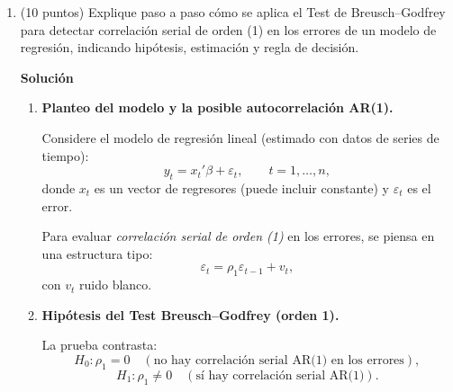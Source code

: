\documentclass[10pt,a4paper]{article}
\begin{document}
\begin{enumerate}
\textbf{(b) Efecto de incluir una variable instrumental.}
Si existe endogeneidad (\(\mathrm{Cov}(X,u)\neq0\)), el estimador MCO es sesgado e inconsistente. Al usar VI/MC2E se identifica el efecto causal utilizando solo la parte \emph{exógena} de \(X\) inducida por \(Z\), obteniendo un estimador \(\hat\beta_{IV}\) consistente. 
En modelos simples, \(\hat\beta_{IV} = \dfrac{\mathrm{Cov}(Y,Z)}{\mathrm{Cov}(X,Z)}\). 
Comparativamente, cuando la omisión de habilidad provoca que MCO sobreestime el retorno a la educación, suele observarse \(\hat\beta_{MCO}>\hat\beta_{IV}\); si el problema fuera error de medición en \(X\), entonces \(\hat\beta_{MCO}<\hat\beta_{IV}\). 
Eso sí, la varianza de \(\hat\beta_{IV}\) tiende a ser mayor que la de MCO y aumenta si el instrumento es débil (bajo \(R^2\) en la primera etapa). 

\item (10 puntos) Explique paso a paso cómo se aplica el Test de Breusch--Godfrey para detectar correlación serial de orden (1) en los errores de un modelo de regresión, indicando hipótesis, estimación y regla de decisión.


\textbf{Solución}
\begin{enumerate}
\item \textbf{Planteo del modelo y la posible autocorrelación AR(1).}

Considere el modelo de regresión lineal (estimado con datos de series de tiempo):
\[
y_t = x_t'\beta + \varepsilon_t, \qquad t=1,\dots,n,
\]
donde $x_t$ es un vector de regresores (puede incluir constante) y $\varepsilon_t$ es el error.

Para evaluar \emph{correlación serial de orden (1)} en los errores, se piensa en una estructura tipo:
\[
\varepsilon_t = \rho_1 \varepsilon_{t-1} + v_t,
\]
con $v_t$ ruido blanco.

\item \textbf{Hipótesis del Test Breusch--Godfrey (orden 1).}

La prueba contrasta:
\[
H_0:\rho_1=0 \quad (\text{no hay correlación serial AR(1) en los errores}),
\]
\[
H_1:\rho_1\neq 0 \quad (\text{sí hay correlación serial AR(1)}).
\]


\end{enumerate}
\end{enumerate}
\end{document}

